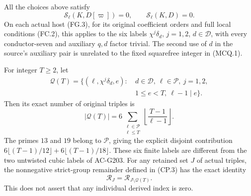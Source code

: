 \begin{theorem}
\label{AC-G207}
All the choices above satisfy
\[
       \mathcal S_\ell(K,D[\varpi])=0,
       \qquad \mathcal S_\ell(K,D)=0.          \tag{MCQ.5}
\]
On each actual host (FG.3), for its original coefficient orders
and full local conditions (FC.2), this applies to the six labels
$\chi^j\delta_d$, $j=1,2$, $d\in\mathcal D$, with every
conductor-seven and auxiliary $q,d$ factor trivial.  The second
use of $d$ in the source's auxiliary pair is unrelated to the
fixed squarefree integer in (MCQ.1).

For integer $T\geq2$, let
\[
 \begin{split}
 \mathcal Q(T)=\{(\ell,\chi^j\delta_d,e):\ &d\in\mathcal D,
  \ \ell\in\mathscr P,\ j=1,2,\\
 &1\leq e<T,\ \ell-1\mid e\}.
 \end{split}
 \tag{MCQ.6}
\]
Then its exact number of original triples is
\[
 |\mathcal Q(T)|=
 6\sum_{\substack{\ell\in\mathscr P\\\ell\leq T}}
              \left\lfloor\frac{T-1}{\ell-1}\right\rfloor.
 \tag{MCQ.7}
\]
The primes $13$ and $19$ belong to $\mathscr P$, giving the
explicit disjoint contribution
$6\lfloor(T-1)/12\rfloor+6\lfloor(T-1)/18\rfloor$.
These six finite labels are different from the two untwisted
cubic labels of AC-G203.
For any retained set $J$ of actual triples, the nonnegative
strict-group remainder defined in (CP.3) has the exact identity
\[
             \mathcal R_J=\mathcal R_{J\setminus\mathcal Q(T)}.
 \tag{MCQ.8}
\]
This does not assert that any individual derived index is zero.
\end{theorem}

